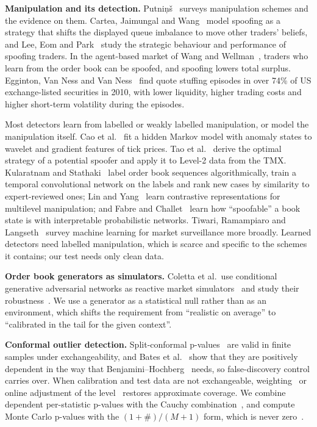 \documentclass[journal]{IEEEtran}
\begin{document}
\textbf{Manipulation and its detection.} Putni\c{n}\v{s}~\cite{putnins2012market} surveys manipulation
schemes and the evidence on them. Cartea, Jaimungal and Wang~\cite{cartea2020spoofing} model spoofing as a
strategy that shifts the displayed queue imbalance to move other traders' beliefs, and Lee, Eom and
Park~\cite{lee2013microstructure} study the strategic behaviour and performance of spoofing traders. In the
agent-based market of Wang and Wellman~\cite{wang2017spoofing}, traders who learn from the order book can be
spoofed, and spoofing lowers total surplus. Egginton, Van Ness and Van Ness~\cite{egginton2016quote} find quote
stuffing episodes in over 74\% of US exchange-listed securities in 2010, with lower liquidity, higher trading
costs and higher short-term volatility during the episodes.

Most detectors learn from labelled or weakly labelled manipulation, or model the manipulation itself. Cao et
al.~\cite{cao2015adaptive} fit a hidden Markov model with anomaly states to wavelet and gradient features of tick
prices. Tao et al.~\cite{tao2022detecting} derive the optimal strategy of a potential spoofer and apply it to
Level-2 data from the TMX. Kularatnam and Stathaki~\cite{kularatnam2024detecting} label order book sequences
algorithmically, train a temporal convolutional network on the labels and rank new cases by similarity to
expert-reviewed ones; Lin and Yang~\cite{lin2025detecting} learn contrastive
representations for multilevel manipulation; and Fabre and Challet~\cite{fabre2025learning} learn how
``spoofable'' a book state is with interpretable probabilistic networks. Tiwari, Ramampiaro and
Langseth~\cite{tiwari2021machine} survey machine learning for market surveillance more broadly. Learned
detectors need labelled manipulation, which is scarce and specific to the schemes it contains; our test needs
only clean data.

\textbf{Order book generators as simulators.} Coletta et al.\ use conditional generative adversarial networks
as reactive market simulators~\cite{coletta2021towards} and study their robustness~\cite{coletta2023conditional}.
We use a generator as a statistical null rather than as an environment, which shifts the requirement from
``realistic on average'' to ``calibrated in the tail for the given context''.

\textbf{Conformal outlier detection.} Split-conformal p-values~\cite{vovk2005algorithmic} are valid in finite
samples under exchangeability, and Bates et al.~\cite{bates2023testing} show that they are positively dependent
in the way that Benjamini--Hochberg~\cite{benjamini1995controlling} needs, so false-discovery control carries
over. When calibration and test data are not exchangeable, weighting~\cite{tibshirani2019conformal,
barber2023conformal} or online adjustment of the level~\cite{gibbs2021adaptive} restores approximate coverage.
We combine dependent per-statistic p-values with the Cauchy combination~\cite{liu2020cauchy}, and compute Monte
Carlo p-values with the $(1+\#)/(M+1)$ form, which is never zero~\cite{phipson2010permutation}.
\end{document}
